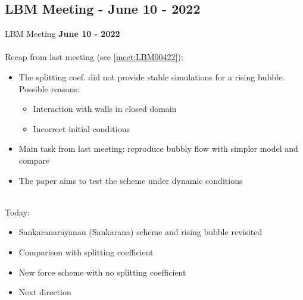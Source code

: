 \documentclass[8pt]{beamer}
\begin{document}
	\subsection{LBM Meeting - June 10 - 2022}
	\label{}
	\justifying
	\begin{frame}{LBM Meeting}
		\textbf{June 10 - 2022}\\~\\
		Recap from last meeting (see \ref{meet:LBM00422}):
		\begin{itemize}
			\item The splitting coef. did not provide stable simulations for a rising bubble. Possible reasons:
				\begin{itemize}
					\item Interaction with walls in closed domain
					\item Incorrect initial conditions
				\end{itemize}
			\item Main task from last meeting: reproduce bubbly flow with simpler model and compare
			\item The paper aims to test the scheme under dynamic conditions
		\end{itemize}
		
		~\\Today:
		\begin{itemize}
			\item Sankaranarayanan (Sankarana) scheme and rising bubble revisited
			\item Comparison with splitting coefficient
			\item New force scheme with no splitting coefficient
			\item Next direction
		\end{itemize}
	\end{frame}
\end{document}
